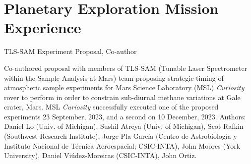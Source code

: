 \documentclass[11pt, letterpaper]{article}
\newcommand{\amper}{{\fontspec[Scale=.95]{Adobe Caslon Pro}\selectfont\itshape\&}}
\newcommand{\years}[1]{\marginnote{\scriptsize #1}}
\begin{document}
%
%
%

\section*{Planetary Exploration Mission Experience}
\label{sec:missions}  %
\noindent
\years{2023}TLS-SAM Experiment Proposal, Co-author
\begin{adjustwidth}{5pt}{0pt}
    Co-authored proposal with members of TLS-SAM (Tunable Laser Spectrometer
    within the Sample Analysis at Mars) team proposing strategic timing of
    atmospheric sample experiments for Mars Science Laboratory (MSL)
    \textit{Curiosity} rover to perform in order to constrain sub-diurnal
    methane variations at Gale crater, Mars. MSL \textit{Curiosity}
    successfully executed one of the proposed experiments 23 September, 2023,
    and a second on 10 December, 2023. Authors: Daniel Lo (Univ. of Michigan),
    Sushil Atreya (Univ. of Michigan), Scot Rafkin (Southwest Research
    Institute), Jorge Pla-Garc\'{i}a (Centro de Astrobiolog\'{i}a y Instituto Nacional de T\'{e}cnica Aeroespacial; CSIC-INTA),
    John Moores (York University), Daniel Vi\'{u}dez-Moreiras (CSIC-INTA), John
    Ortiz.
\end{adjustwidth}

\end{document}
